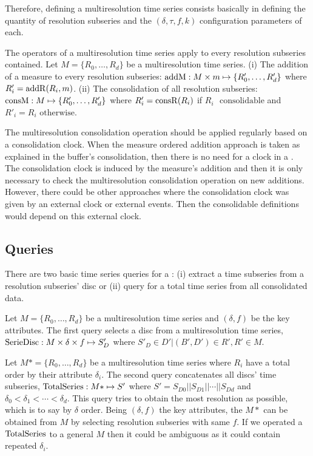 Therefore, defining a multiresolution time series consists basically
in defining the quantity of resolution subseries and the
$(\delta,\tau,f,k)$ configuration parameters of each.


The operators of a multiresolution time series apply to every
resolution subseries contained. Let $M=\{R_0,\allowbreak
\dots,\allowbreak R_d\}$ be a multiresolution time series.  (i) The
addition of a measure to every resolution subseries: $\operatorname{addM} : M \times
m \mapsto \{R'_0, \dots,\allowbreak R'_d\}$ where
$R'_i=\operatorname{addR}(R_i,m)$. (ii) The consolidation of all resolution
subseries: $\operatorname{consM} : M \mapsto \{R'_0,\allowbreak \dots,\allowbreak
R'_d\}$ where $R'_i = \operatorname{consR}(R_i)$ if $R_i$ $\text{ consolidable}$ and
$R'_i=R_i$ $\text{otherwise}$.


The multiresolution consolidation operation should be applied
regularly based on a consolidation clock. When the measure ordered
addition approach is taken as explained in the buffer's consolidation,
then there is no need for a clock in a . The consolidation clock
is induced by the measure's addition and then it is only necessary to
check the multiresolution consolidation operation on new
additions. However, there could be other approaches where the
consolidation clock was given by an external clock or external
events. Then the consolidable definitions would depend on this
external clock.





\subsection{Queries}


There are two basic time series queries for a : (i) extract a
time subseries from a resolution subseries' disc or (ii) query for a
total time series from all consolidated data.

Let $M=\{R_0, \dots, R_d\}$ be a multiresolution time series and
$(\delta,f)$ be the key attributes. The first query selects a disc
from a multiresolution time series, $\operatorname{SerieDisc}: M\times \delta \times
f \mapsto S'_D$ where $S'_D \in D' | (B',D') \in R',R' \in M$.

Let $M*=\{R_0, \dots, R_d\}$ be a multiresolution time series where
$R_i$ have a total order by their attribute $\delta_i$.  The second
query concatenates all discs' time subseries, $\operatorname{TotalSeries}: M*
\mapsto S'$ where $S' = S_{D0} || S_{D1} || \cdots || S_{Dd}$ and
$\delta_0 < \delta_1 < \cdots < \delta_d$. This query tries to obtain
the most resolution as possible, which is to say by $\delta$ order.
Being $(\delta,f)$ the key attributes, the $M*$ can be obtained from
$M$ by selecting resolution subseries with same $f$. If we operated a
$\operatorname{TotalSeries}$ to a general $M$ then it could be ambiguous as it could
contain repeated $\delta_i$.


